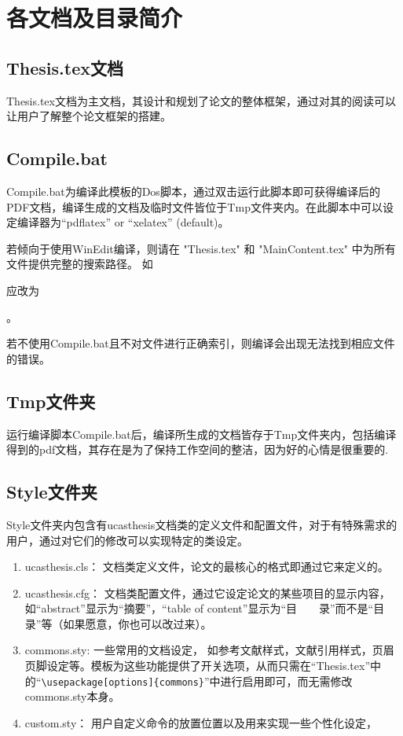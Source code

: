 \section{各文档及目录简介}

\subsection{Thesis.tex文档 }

Thesis.tex文档为主文档，其设计和规划了论文的整体框架，通过对其的阅读可以让用户了解整个论文框架的搭建。

\subsection{Compile.bat}

Compile.bat为编译此模板的Dos脚本，通过双击运行此脚本即可获得编译后的PDF文档，编译生成的文档及临时文件皆位于Tmp文件夹内。在此脚本中可以设定编译器为“pdflatex” or “xelatex” (default)。

若倾向于使用WinEdit编译，则请在 "Thesis.tex" 和 "Main\textunderscore Content.tex" 中为所有文件提供完整的搜索路径。 如 

\verb++ 

应改为 

\verb++。

若不使用Compile.bat且不对文件进行正确索引，则编译会出现无法找到相应文件的错误。

\subsection{Tmp文件夹}

运行编译脚本Compile.bat后，编译所生成的文档皆存于Tmp文件夹内，包括编译得到的pdf文档，其存在是为了保持工作空间的整洁，因为好的心情是很重要的.

\subsection{Style文件夹}

Style文件夹内包含有ucasthesis文档类的定义文件和配置文件，对于有特殊需求的用户，通过对它们的修改可以实现特定的类设定。

\begin{enumerate}
  \item ucasthesis.cls： 文档类定义文件，论文的最核心的格式即通过它来定义的。
  \item ucasthesis.cfg： 文档类配置文件，通过它设定论文的某些项目的显示内容，如“abstract”显示为“摘要”，“table of content”显示为“目~~~~录”而不是“目录”等（如果愿意，你也可以改过来）。
  \item commons.sty: 一些常用的文档设定， 如参考文献样式，文献引用样式，页眉页脚设定等。模板为这些功能提供了开关选项，从而只需在“Thesis.tex”中的“\verb+\usepackage[options]{commons}+”中进行启用即可，而无需修改commons.sty本身。
  \item custom.sty： 用户自定义命令的放置位置以及用来实现一些个性化设定，
\end{enumerate}


